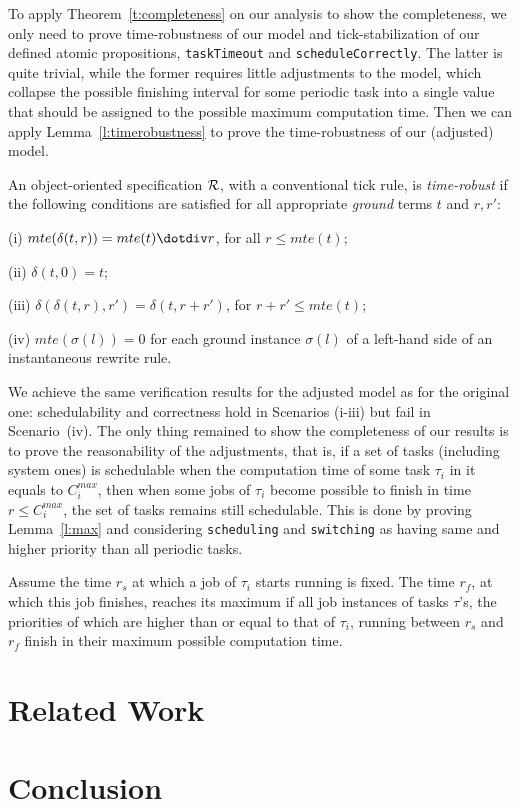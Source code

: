 \documentclass{llncs}
\begin{document}
To apply Theorem~\ref{t:completeness} on our analysis to show the
completeness, we only need to prove time-robustness of our model and
tick-stabilization of our defined atomic propositions,
\verb|taskTimeout| and \verb|scheduleCorrectly|. The latter is quite
trivial, while the former requires little adjustments to the model,
which collapse the possible finishing interval for some periodic task
into a single value that should be assigned to the possible maximum
computation time. Then we can apply Lemma~\ref{l:timerobustness} to
prove the time-robustness of our (adjusted) model.
\begin{lemma}
\label{l:timerobustness}
An object-oriented specification $\cal R$, with a conventional tick
rule, is \emph{time-robust} if the following conditions are satisfied
for all appropriate \emph{ground} terms $t$ and $r,r'$:

\noindent
(i) $mte(\delta(t,r))=mte(t)\dotdiv r$, for all $r\le mte(t)$;

\noindent
(ii) $\delta(t,0)=t$;

\noindent
(iii) $\delta(\delta(t,r),r')=\delta(t,r+r')$, for $r+r'\le mte(t)$;

\noindent
(iv) $mte(\sigma(l))=0$ for each ground instance $\sigma(l)$ of a
left-hand side of an instantaneous rewrite rule.
\end{lemma}

We achieve the same verification results for the adjusted model as for
the original one: schedulability and correctness hold in Scenarios
(i-iii) but fail in Scenario~(iv). The only thing remained to show the
completeness of our results is to prove the reasonability of the
adjustments, that is, if a set of tasks (including system ones) is
schedulable when the computation time of some task $\tau_i$ in it
equals to $C_i^{max}$, then when some jobs of $\tau_i$ become possible
to finish in time $r\le C_i^{max}$, the set of tasks remains still
schedulable. This is done by proving Lemma~\ref{l:max} and considering
\verb|scheduling| and \verb|switching| as having same and higher
priority than all periodic tasks.
\begin{lemma}
\label{l:max}
Assume the time $r_s$ at which a job of $\tau_i$ starts running is
fixed. The time $r_f$, at which this job finishes, reaches its maximum
if all job instances of tasks $\tau$'s, the priorities of which are
higher than or equal to that of $\tau_i$, running between $r_s$ and
$r_f$ finish in their maximum possible computation time.
\end{lemma}


\section{Related Work}
\label{s:relate}


\section{Conclusion}
\label{s:conclusion}




\end{document}
